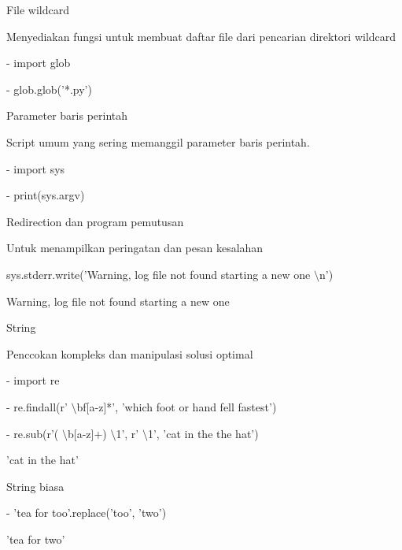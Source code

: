  \par
\vspace{12pt}
\noindent 
File wildcard \par
\noindent 
Menyediakan fungsi untuk membuat daftar file dari pencarian direktori wildcard \par
\vspace{12pt}
\noindent 
- import glob \par
\vspace{12pt}
\noindent 
- glob.glob('*.py') \par
{} \par
\noindent 
Parameter baris perintah  \par
\noindent 
Script umum yang sering memanggil parameter baris perintah.  \par
\noindent 
- import sys \par
\noindent 
- print(sys.argv) \par
{} \par
\vspace{12pt}
\noindent 
Redirection dan program pemutusan \par
\noindent 
Untuk menampilkan peringatan dan pesan kesalahan \par
\noindent 
 sys.stderr.write('Warning, log file not found starting a new one $  \setminus  $n') \par
\noindent 
Warning, log file not found starting a new one \par
\noindent 
String \par
\noindent 
Penccokan kompleks dan manipulasi solusi optimal \par
\noindent 
- import re \par
\noindent 
- re.findall(r' $  \setminus  $bf[a-z]*', 'which foot or hand fell fastest') \par
{} \par
\vspace{12pt}
\noindent 
- re.sub(r'( $  \setminus  $b[a-z]+)  $  \setminus  $1', r' $  \setminus  $1', 'cat in the the hat') \par
\noindent 
'cat in the hat' \par
\vspace{12pt}
\noindent 
String biasa \par
\noindent 
- 'tea for too'.replace('too', 'two') \par
\noindent 
'tea for two' \par
